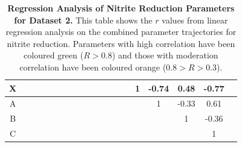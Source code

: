 \begin{table}[p]
{\begin{minipage}{24.4cm}
\begin{tabular}{|c|c|c|c|c|c|c|c|c|c|c|c|c|c|c|c|c|c|c|}
\cellcolor{dark-gray}X & \cellcolor{light-gray} & \cellcolor{light-gray} & \cellcolor{light-gray} & \cellcolor{light-gray} & \cellcolor{light-gray} & \cellcolor{light-gray} & \cellcolor{light-gray} & \cellcolor{light-gray} & \cellcolor{light-gray} & \cellcolor{light-gray} & \cellcolor{light-gray} & \cellcolor{light-gray} & \cellcolor{light-gray} & \cellcolor{light-gray}1 & \cellcolor{orange}-0.74 & \cellcolor{orange}0.48 & \cellcolor{orange}-0.77\\ \hline
\cellcolor{dark-gray}A & \cellcolor{light-gray} & \cellcolor{light-gray} & \cellcolor{light-gray} & \cellcolor{light-gray} & \cellcolor{light-gray} & \cellcolor{light-gray} & \cellcolor{light-gray} & \cellcolor{light-gray} & \cellcolor{light-gray} & \cellcolor{light-gray} & \cellcolor{light-gray} & \cellcolor{light-gray} & \cellcolor{light-gray} & \cellcolor{light-gray} & \cellcolor{light-gray}1 & \cellcolor{orange}-0.33 & \cellcolor{orange}0.61\\ \hline
\cellcolor{dark-gray}B & \cellcolor{light-gray} & \cellcolor{light-gray} & \cellcolor{light-gray} & \cellcolor{light-gray} & \cellcolor{light-gray} & \cellcolor{light-gray} & \cellcolor{light-gray} & \cellcolor{light-gray} & \cellcolor{light-gray} & \cellcolor{light-gray} & \cellcolor{light-gray} & \cellcolor{light-gray} & \cellcolor{light-gray} & \cellcolor{light-gray} & \cellcolor{light-gray} & \cellcolor{light-gray}1 & \cellcolor{orange}-0.36\\ \hline
\cellcolor{dark-gray}C & \cellcolor{light-gray} & \cellcolor{light-gray} & \cellcolor{light-gray} & \cellcolor{light-gray} & \cellcolor{light-gray} & \cellcolor{light-gray} & \cellcolor{light-gray} & \cellcolor{light-gray} & \cellcolor{light-gray} & \cellcolor{light-gray} & \cellcolor{light-gray} & \cellcolor{light-gray} & \cellcolor{light-gray} & \cellcolor{light-gray} & \cellcolor{light-gray} & \cellcolor{light-gray} & \cellcolor{light-gray}1\\
\hline
  \end{tabular}
  \caption[Regression Analysis of Nitrite Reduction Parameters]{{\bf Regression Analysis of Nitrite Reduction Parameters for Dataset 2.} This table shows the $r$ values from linear regression analysis on the combined parameter trajectories for nitrite reduction. Parameters with high correlation have been coloured green ($R>0.8$) and those with moderation correlation have been coloured orange ($0.8>R>0.3$).
  \label{tab:nitrite-regression}}
  \end{minipage}
  }
\end{table}
\afterpage{\clearpage}

